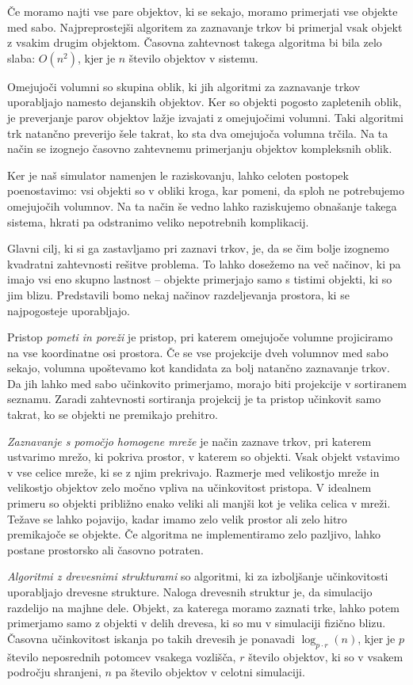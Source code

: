 \documentclass[a4paper,12pt]{article}
\begin{document}
Če moramo najti vse pare objektov, ki se sekajo, moramo primerjati vse objekte med sabo.
Najpreprostejši algoritem za zaznavanje trkov bi primerjal vsak objekt z vsakim drugim objektom. Časovna
zahtevnost takega algoritma bi bila zelo slaba: $O(n^2)$, kjer je $n$ število objektov v sistemu.

Omejujoči volumni so skupina oblik, ki jih algoritmi za zaznavanje trkov uporabljajo namesto dejanskih objektov.
Ker so objekti pogosto zapletenih oblik, je preverjanje parov objektov lažje izvajati z omejujočimi volumni.
Taki algoritmi trk natančno preverijo šele takrat, ko sta dva omejujoča volumna trčila. Na ta način se izognejo
časovno zahtevnemu primerjanju objektov kompleksnih oblik.

Ker je naš simulator namenjen le raziskovanju, lahko celoten postopek poenostavimo: vsi objekti so v obliki
kroga, kar pomeni, da sploh ne potrebujemo omejujočih volumnov. Na ta način še vedno lahko raziskujemo
obnašanje takega sistema, hkrati pa odstranimo veliko nepotrebnih komplikacij.

Glavni cilj, ki si ga zastavljamo pri zaznavi trkov, je, da se čim bolje izognemo kvadratni zahtevnosti
rešitve problema. To lahko dosežemo na več načinov, ki pa imajo vsi eno skupno lastnost -- objekte 
primerjajo samo s tistimi objekti, ki so jim blizu. Predstavili bomo nekaj načinov razdeljevanja prostora,
ki se najpogosteje uporabljajo.

Pristop \textit{pometi in poreži} je pristop, pri katerem omejujoče volumne projiciramo na vse koordinatne osi prostora. Če se vse projekcije
dveh volumnov med sabo sekajo, volumna upoštevamo kot kandidata za bolj natančno zaznavanje trkov. Da jih lahko med sabo učinkovito
primerjamo, morajo biti projekcije v sortiranem seznamu. Zaradi zahtevnosti sortiranja projekcij je ta pristop
učinkovit samo takrat, ko se objekti ne premikajo prehitro.

\textit{Zaznavanje s pomočjo homogene mreže} je način zaznave trkov, pri katerem ustvarimo mrežo, ki pokriva prostor, v katerem
so objekti. Vsak objekt vstavimo v vse celice mreže, ki se z njim prekrivajo. Razmerje med velikostjo mreže in velikostjo
objektov zelo močno vpliva na učinkovitost pristopa. V idealnem primeru so objekti približno enako veliki ali manjši kot
je velika celica v mreži. Težave se lahko pojavijo, kadar imamo zelo velik prostor ali zelo
hitro premikajoče se objekte. Če algoritma ne implementiramo zelo pazljivo, lahko postane prostorsko ali časovno potraten.

\textit{Algoritmi z drevesnimi strukturami} so algoritmi, ki za izboljšanje učinkovitosti uporabljajo drevesne strukture.
Naloga drevesnih struktur je, da simulacijo razdelijo na majhne dele. Objekt, za katerega moramo zaznati trke,
lahko potem primerjamo samo z objekti v delih drevesa, ki so mu v simulaciji fizično blizu. Časovna učinkovitost 
iskanja po takih drevesih je ponavadi {\small$\log_{p \cdot r}(n)$}, kjer je $p$ število neposrednih potomcev vsakega vozlišča,
$r$ število objektov, ki so v vsakem področju shranjeni, $n$ pa število objektov v celotni simulaciji. 
\end{document}

